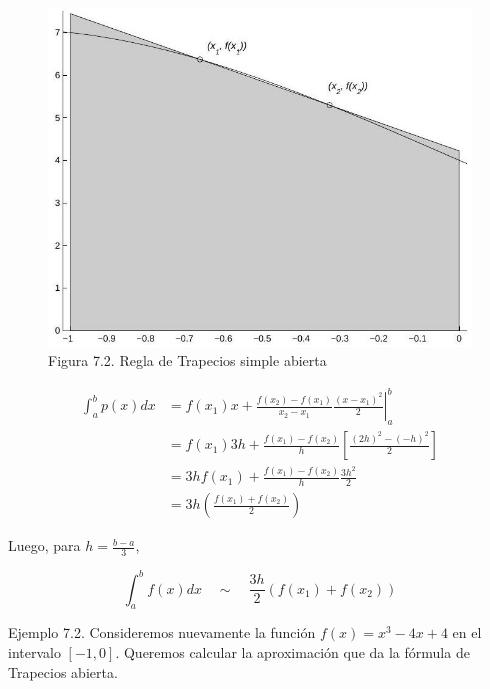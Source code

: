 \documentclass[10pt]{article}
\begin{document}
\begin{figure}[h]
\begin{center}
  \includegraphics[width=\textwidth]{2025_09_05_3888c9ac96bd653d96b4g-140}
\captionsetup{labelformat=empty}
\caption{Figura 7.2. Regla de Trapecios simple abierta}
\end{center}
\end{figure}

$$
\begin{aligned}
\int_{a}^{b} p(x) d x & =f\left(x_{1}\right) x+\left.\frac{f\left(x_{2}\right)-f\left(x_{1}\right)}{x_{2}-x_{1}} \frac{\left(x-x_{1}\right)^{2}}{2}\right|_{a} ^{b} \\
& =f\left(x_{1}\right) 3 h+\frac{f\left(x_{1}\right)-f\left(x_{2}\right)}{h}\left[\frac{(2 h)^{2}-(-h)^{2}}{2}\right] \\
& =3 h f\left(x_{1}\right)+\frac{f\left(x_{1}\right)-f\left(x_{2}\right)}{h} \frac{3 h^{2}}{2} \\
& =3 h\left(\frac{f\left(x_{1}\right)+f\left(x_{2}\right)}{2}\right)
\end{aligned}
$$

Luego, para $h=\frac{b-a}{3}$,


\begin{equation*}
\int_{a}^{b} f(x) d x \quad \sim \quad \frac{3 h}{2}\left(f\left(x_{1}\right)+f\left(x_{2}\right)\right) \tag{7.3}
\end{equation*}


Ejemplo 7.2. Consideremos nuevamente la función $f(x)=x^{3}-4 x+4$ en el intervalo $[-1,0]$. Queremos calcular la aproximación que da la fórmula de Trapecios abierta.
\end{document}
